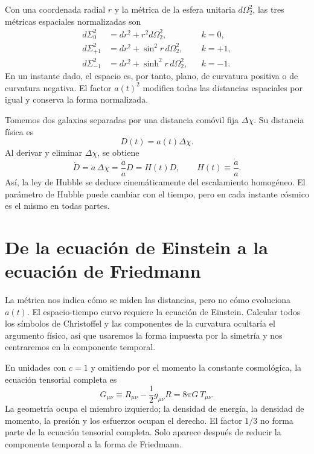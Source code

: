 Con una coordenada radial \(r\) y la métrica de la esfera unitaria \(d\Omega_2^2\), las tres métricas espaciales normalizadas son
\begin{align}
d\Sigma_0^2 &= dr^2+r^2d\Omega_2^2,
&& k=0,
\label{eq:c04-flat-space}\\
d\Sigma_{+1}^2 &= dr^2+\sin^2 r\,d\Omega_2^2,
&& k=+1,
\label{eq:c04-spherical-space}\\
d\Sigma_{-1}^2 &= dr^2+\sinh^2 r\,d\Omega_2^2,
&& k=-1.
\label{eq:c04-hyperbolic-space}
\end{align}
En un instante dado, el espacio es, por tanto, plano, de curvatura positiva o de curvatura negativa. El factor \(a(t)^2\) modifica todas las distancias espaciales por igual y conserva la forma normalizada.

Tomemos dos galaxias separadas por una distancia comóvil fija \(\Delta\chi\). Su distancia física es
\begin{equation}
D(t)=a(t)\Delta\chi.
\end{equation}
Al derivar y eliminar \(\Delta\chi\), se obtiene
\begin{equation}
\dot D=\dot a\,\Delta\chi
      =\frac{\dot a}{a}D
      =H(t)D,
\qquad
H(t)\equiv\frac{\dot a}{a}.
\label{eq:c04-hubble-law}
\end{equation}
Así, la ley de Hubble se deduce cinemáticamente del escalamiento homogéneo. El parámetro de Hubble puede cambiar con el tiempo, pero en cada instante cósmico es el mismo en todas partes.

\section{De la ecuación de Einstein a la ecuación de Friedmann}

La métrica nos indica cómo se miden las distancias, pero no cómo evoluciona \(a(t)\). El espacio-tiempo curvo requiere la ecuación de Einstein. Calcular todos los símbolos de Christoffel y las componentes de la curvatura ocultaría el argumento físico, así que usaremos la forma impuesta por la simetría y nos centraremos en la componente temporal.

En unidades con \(c=1\) y omitiendo por el momento la constante cosmológica, la ecuación tensorial completa es
\begin{equation}
G_{\mu\nu}
\equiv
R_{\mu\nu}-\frac12 g_{\mu\nu}R
=8\pi G\,T_{\mu\nu}.
\label{eq:c04-einstein}
\end{equation}
La geometría ocupa el miembro izquierdo; la densidad de energía, la densidad de momento, la presión y los esfuerzos ocupan el derecho. El factor \(1/3\) no forma parte de la ecuación tensorial completa. Solo aparece después de reducir la componente temporal a la forma de Friedmann.

